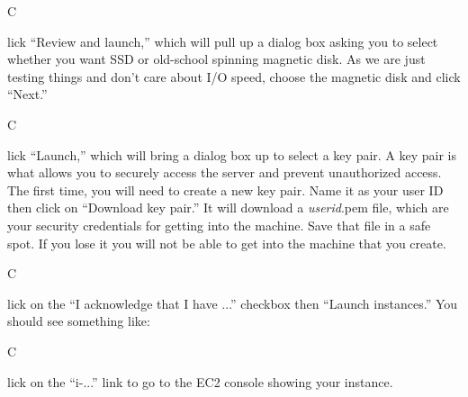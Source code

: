 \documentclass[titlepage]{tufte-book}
\newcounter{problem}
\newcommand{\step}[1]{{}
\vspace{4pt} \noindent {\bf \theproblem. }#1\addtocounter{problem}{1}}
\begin{document}
\begin{fullwidth}
\step Click ``Review and launch,'' which will pull up a dialog box asking you to select whether you want SSD or old-school spinning magnetic disk. As we are just testing things and don't care about I/O speed, choose the magnetic disk and click ``Next.''


\step Click ``Launch,'' which will bring a dialog box up to select a key pair. A key pair is what allows you to securely access the server and prevent unauthorized access. The first time, you will need to create a new key pair. Name it as your user ID then click on ``Download key pair.'' It will download a {\em userid}.pem file, which are your security credentials for getting into the machine. Save that file in a safe spot. If you lose it you will not be able to get into the machine that you create.


\step Click on the ``I acknowledge that I have ...'' checkbox then ``Launch instances.'' You should see something like:


\step Click on the ``i-...'' link to go to the EC2 console showing your instance.



\end{fullwidth}
\end{document}
